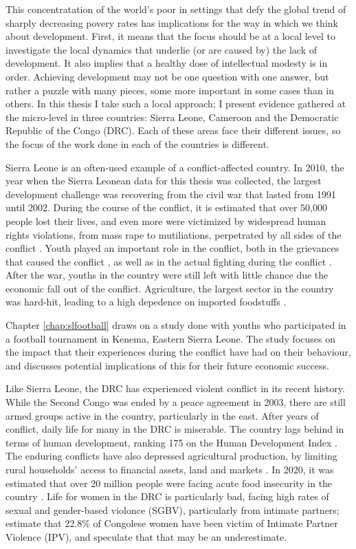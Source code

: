 This concentratation of the world's poor in settings that defy the global trend of sharply decreasing povery rates has implications for the way in which we think about development. First, it means that the focus should be at a local level to investigate the local dynamics that underlie (or are caused by) the lack of development. It also implies that a healthy dose of intellectual modesty is in order. Achieving development may not be one question with one answer, but rather a puzzle with many pieces, some more important in some cases than in others. In this thesis I take such a local approach; I  present evidence gathered at the micro-level in three countries: Sierra Leone, Cameroon and the Democratic Republic of the Congo (DRC). Each of these areas face their different issues, so the focus of the work done in each of the countries is different.

Sierra Leone is an often-used example of a conflict-affected country. In 2010, the year when the Sierra Leonean data for this thesis was collected, the largest development challenge was recovering from the civil war that lasted from 1991 until 2002. During the course of the conflict, it is estimated that over 50,000 people lost their lives, and even more were victimized by widespread human rights violations, from mass rape to mutiliations, perpetrated by all sides of the conflict \citep{HumanRightsWatch1999a}. Youth played an important role in the conflict, both in the grievances that caused the conflict \citep[see e.g.][]{Peters1998,Richards2005,Peters2011}, as well as in the actual fighting during the conflict \citep{Humphreys2013}. After the war, youths in the country were still left with little chance due the economic fall out of the conflict.  Agriculture, the largest sector in the country was hard-hit, leading to a high depedence on imported foodstuffs \citep{FAO2005}. 

Chapter \ref{chap:slfootball} draws on a study done with youths who participated in a football tournament in Kenema, Eastern Sierra Leone. The study focuses on the impact that their experiences during the conflict have had on their behaviour, and discusses potential implications of this for their future economic success. 

Like Sierra Leone, the DRC has experienced violent conflict in its recent history. While the Second Congo was ended by a peace agreement in 2003, there are still armed groups active in the country, particularly in the east. After years of conflict, daily life for many in the DRC is miserable. The country lags behind in terms of human development, ranking 175 on the Human Development Index \citep{UNDP2020a}. The enduring conflicts have also depressed agricultural production, by limiting rural households' access to financial assets, land and markets \citep{Lecoutere2005, Vlassenroot}. In 2020, it was estimated that over 20 million people were facing acute food insecurity in the country \citep{FAO2020}. Life for women in the DRC is particularly bad, facing high rates of sexual and gender-based violonce (SGBV), particularly from intimate partners; \cite{Peterman2011} estimate that 22.8\% of Congolese women have been victim of Intimate Partner Violence (IPV), and speculate that that may be an underestimate.

